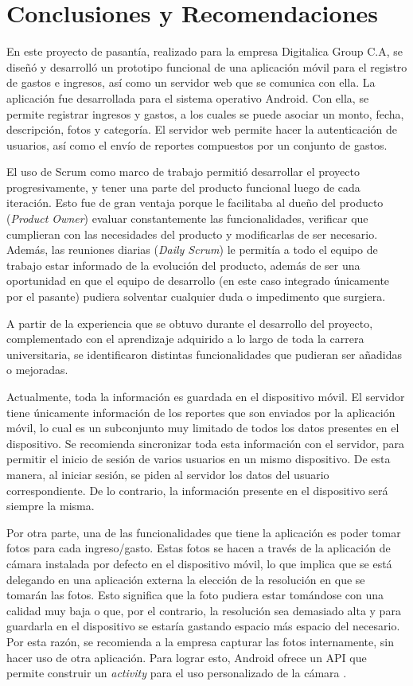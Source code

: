 \chapter{Conclusiones y Recomendaciones} \label{chap:conclusiones}

En este proyecto de pasantía, realizado para la empresa Digitalica Group C.A, se diseñó y desarrolló un prototipo funcional de una aplicación móvil para el registro de gastos e ingresos, así como un servidor web que se comunica con ella.  La aplicación fue desarrollada para el sistema operativo Android. Con ella, se permite registrar ingresos y gastos, a los cuales se puede asociar un monto, fecha, descripción, fotos y categoría. El servidor web permite hacer la autenticación de usuarios, así como el envío de reportes compuestos por un conjunto de gastos.

El uso de Scrum como marco de trabajo permitió desarrollar el proyecto progresivamente, y tener una parte del producto funcional luego de cada iteración. Esto fue de gran ventaja porque le facilitaba al dueño del producto (\textit{Product Owner}) evaluar constantemente las funcionalidades, verificar que cumplieran con las necesidades del producto y modificarlas de ser necesario. Además, las reuniones diarias (\textit{Daily Scrum}) le permitía a todo el equipo de trabajo estar informado de la evolución del producto, además de ser una oportunidad en que el equipo de desarrollo (en este caso integrado únicamente por el pasante) pudiera solventar cualquier duda o impedimento que surgiera.

A partir de la experiencia que se obtuvo durante el desarrollo del proyecto, complementado con el aprendizaje adquirido a lo largo de toda la carrera universitaria, se identificaron distintas funcionalidades que pudieran ser añadidas o mejoradas.

Actualmente, toda la información es guardada en el dispositivo móvil. El servidor tiene únicamente información de los reportes que son enviados por la aplicación móvil, lo cual es un subconjunto  muy limitado de todos los datos presentes en el dispositivo. Se recomienda sincronizar toda esta información con el servidor, para permitir el inicio de sesión de varios usuarios en un mismo dispositivo. De esta manera, al iniciar sesión, se piden al servidor los datos del usuario correspondiente. De lo contrario, la información presente en el dispositivo será siempre la misma. 

Por otra parte, una de las funcionalidades que tiene la aplicación es poder tomar fotos para cada ingreso/gasto. Estas fotos se hacen a través de la aplicación de cámara instalada por defecto en el dispositivo móvil, lo que implica que se está delegando en una aplicación externa la elección de la resolución en que se tomarán las fotos. Esto significa que la foto pudiera estar tomándose con una calidad muy baja o que, por el contrario, la resolución sea demasiado alta y para guardarla en el dispositivo se estaría gastando espacio más espacio del necesario. Por esta razón, se recomienda a la empresa capturar las fotos internamente, sin hacer uso de otra aplicación. Para lograr esto, Android ofrece un API que permite construir un \textit{activity} para el uso personalizado de la cámara \cite{AND4}.

